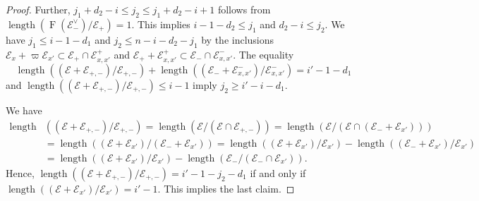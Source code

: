 \documentclass[10pt,a4paper]{amsart}
\newcommand{\cE}{\mathcal{E}}
\DeclareMathOperator{\length}{length}
\DeclareMathOperator{\oF}{F}
\begin{document}
\begin{proof}
Further, 
$j_1 +d_2 -i \leq j_2 \leq j_1 +d_2-i +1$ 
follows from $\length (\oF (\cE_-^{\vee})/\cE_+)=1$. 
This implies 
$i-1-d_2 \leq j_1$ and 
$d_2 -i \leq j_2$. 
We have 
$j_1 \leq i-1-d_1$ and 
$j_2 \leq n-i-d_2 -j_1$ 
by the inclusions 
$\cE_x +\varpi \cE_{x'} \subset \cE_+ \cap \cE_{x,x'}^+$
and 
$\cE_+ +\cE_{x,x'}^+ \subset \cE_- \cap \cE_{x,x'}^-$. 
The equality 
\[
 \length ((\cE +\cE_{+,-} )/ \cE_{+,-}) + \length ((\cE_- +\cE_{x,x'}^-)/ \cE_{x,x'}^- ) = i'-1 -d_1 
\] 
and $\length ((\cE +\cE_{+,-} )/ \cE_{+,-}) \leq i-1$ imply 
$j_2 \geq i'-i-d_1$. 

We have 
\begin{align*}
 \length & ((\cE +\cE_{+,-} )/ \cE_{+,-}) 
 = \length (\cE / (\cE \cap \cE_{+,-}))
 = \length (\cE / (\cE \cap (\cE_- + \cE_{x'} ))) \\ 
 &= \length ((\cE +\cE_{x'})/ (\cE_- + \cE_{x'} )) 
 = \length ((\cE +\cE_{x'})/ \cE_{x'} ) 
 -\length ((\cE_- + \cE_{x'} )/ \cE_{x'} ) \\ 
 &= \length ((\cE +\cE_{x'})/ \cE_{x'} ) 
 -\length (\cE_-/ (\cE_- \cap \cE_{x'} ))  . 
\end{align*}
Hence, 
$\length  ((\cE +\cE_{+,-} )/ \cE_{+,-}) = i'-1 - j_2 -d_1$ 
if and only if 
$\length ((\cE +\cE_{x'})/ \cE_{x'} ) = i'-1$. 
This implies the last claim. 
\end{proof}
\end{document}
